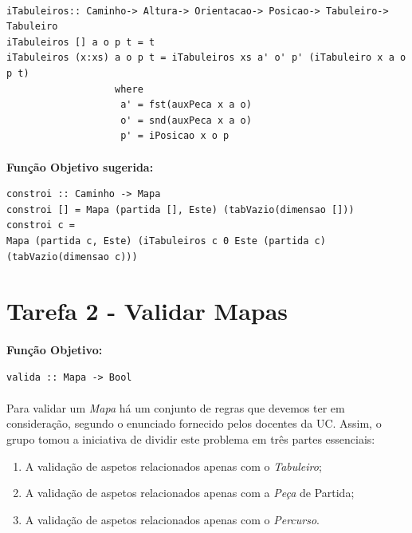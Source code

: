 \documentclass[12pt,a4paper]{report}
\begin{document}
\begin{verbatim}

iTabuleiros:: Caminho-> Altura-> Orientacao-> Posicao-> Tabuleiro-> Tabuleiro 
iTabuleiros [] a o p t = t
iTabuleiros (x:xs) a o p t = iTabuleiros xs a' o' p' (iTabuleiro x a o p t)   
                   where 
                    a' = fst(auxPeca x a o)  
                    o' = snd(auxPeca x a o) 
                    p' = iPosicao x o p
\end{verbatim}

\paragraph{}\textbf{Função Objetivo sugerida:}

\begin{verbatim}
constroi :: Caminho -> Mapa 
constroi [] = Mapa (partida [], Este) (tabVazio(dimensao []))
constroi c =
Mapa (partida c, Este) (iTabuleiros c 0 Este (partida c) (tabVazio(dimensao c)))
\end{verbatim}

\newpage
\section{Tarefa 2 - Validar Mapas}
\label{Tarefa2_2017li1g77}

\paragraph{}\textbf{Função Objetivo:}

\begin{verbatim}
valida :: Mapa -> Bool
\end{verbatim}
 

\paragraph{}Para validar um \textit{Mapa} há um conjunto de regras que devemos ter em consideração, segundo o enunciado fornecido pelos docentes da UC. Assim, o grupo tomou a iniciativa de dividir este problema em três partes essenciais:

\begin{enumerate}
\item A validação de aspetos relacionados apenas com o \textit{Tabuleiro};
\item A validação de aspetos relacionados apenas com a \textit{Peça} de Partida;
\item A validação de aspetos relacionados apenas com o \textit{Percurso}.
\end{enumerate}
\end{document}
